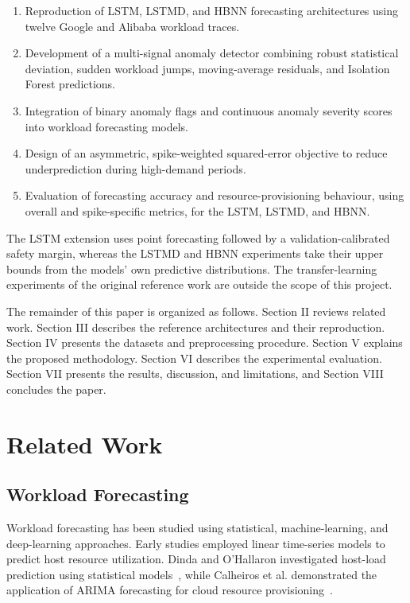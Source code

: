 \documentclass[conference]{IEEEtran}
\begin{document}
\begin{enumerate}
\item Reproduction of LSTM, LSTMD, and HBNN forecasting architectures using twelve Google and Alibaba workload traces.

\item Development of a multi-signal anomaly detector combining robust statistical deviation, sudden workload jumps, moving-average residuals, and Isolation Forest predictions.

\item Integration of binary anomaly flags and continuous anomaly severity scores into workload forecasting models.

\item Design of an asymmetric, spike-weighted squared-error objective to reduce underprediction during high-demand periods.

\item Evaluation of forecasting accuracy and resource-provisioning behaviour, using overall and spike-specific metrics, for the LSTM, LSTMD, and HBNN.
\end{enumerate}

The LSTM extension uses point forecasting followed by a validation-calibrated safety margin, whereas the LSTMD and HBNN experiments take their upper bounds from the models' own predictive distributions. The transfer-learning experiments of the original reference work are outside the scope of this project.

The remainder of this paper is organized as follows. Section II reviews related work. Section III describes the reference architectures and their reproduction. Section IV presents the datasets and preprocessing procedure. Section V explains the proposed methodology. Section VI describes the experimental evaluation. Section VII presents the results, discussion, and limitations, and Section VIII concludes the paper.

\section{Related Work}

\subsection{Workload Forecasting}

Workload forecasting has been studied using statistical, machine-learning, and deep-learning approaches. Early studies employed linear time-series models to predict host resource utilization. Dinda and O'Hallaron investigated host-load prediction using statistical models~\cite{dinda2000}, while Calheiros et al. demonstrated the application of ARIMA forecasting for cloud resource provisioning~\cite{calheiros2015}.
\end{document}
